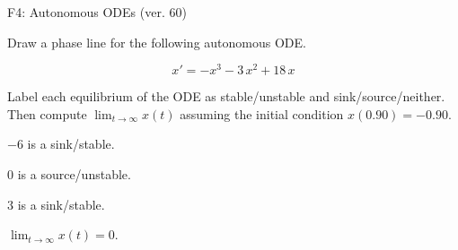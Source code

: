 \begin{exercise}
  \begin{exerciseTitle}F4: Autonomous ODEs (ver. 60)\end{exerciseTitle}
  \begin{exerciseStatement}
    

      Draw a phase line for the following 
      autonomous ODE.
    

    
\[x'= -x^{3} - 3 \, x^{2} + 18 \, x\]

    

      Label each equilibrium of the ODE
      as stable/unstable and sink/source/neither.
      Then compute \(\lim_{t\to\infty}x(t)\)
      assuming the initial condition
      \(x( 0.90 )= -0.90\).
    

  \end{exerciseStatement}
  \begin{exerciseAnswer}
    

      \(-6\) is a sink/stable.
      
        \(0\) is a source/unstable.
      
      \(3\) is a sink/stable.
    

    

      \(\lim_{t\to\infty}x(t)=0\).
    

  \end{exerciseAnswer}
\end{exercise}